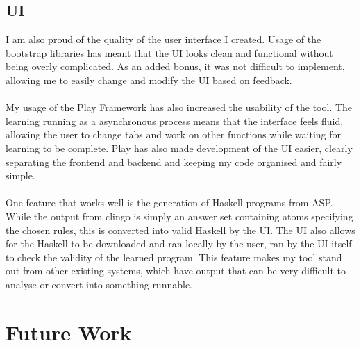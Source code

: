 \subsection{UI} 
I am also proud of the quality of the user interface I created. Usage of the bootstrap libraries has meant that the UI looks clean and functional without being overly complicated. As an added bonus, it was not difficult to implement, allowing me to easily change and modify the UI based on feedback. \\ \\
My usage of the Play Framework has also increased the usability of the tool. The learning running as a asynchronous process means that the interface feels fluid, allowing the user to change tabs and work on other functions while waiting for learning to be complete. Play has also made development of the UI easier, clearly separating the frontend and backend and keeping my code organised and fairly simple. \\ \\
One feature that works well is the generation of Haskell programs from ASP. While the output from clingo is simply an answer set containing atoms specifying the chosen rules, this is converted into valid Haskell by the UI. The UI also allows for the Haskell to be downloaded and ran locally by the user, ran by the UI itself to check the validity of the learned program. This feature makes my tool stand out from other existing systems, which have output that can be very difficult to analyse or convert into something runnable.

\section{Future Work}

